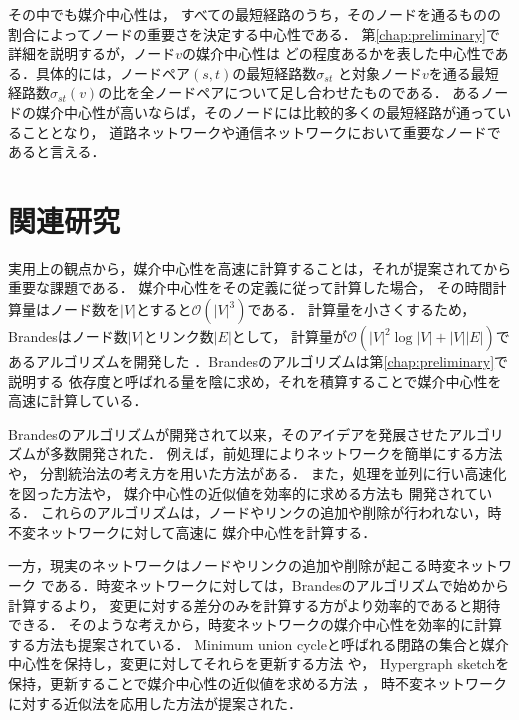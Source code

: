 その中でも媒介中心性\cite{Freeman1977}は，
すべての最短経路のうち，そのノードを通るものの割合によってノードの重要さを決定する中心性である．
第\ref{chap:preliminary}で詳細を説明するが，ノード$v$の媒介中心性は
どの程度あるかを表した中心性である．具体的には，ノードペア$(s,t)$の最短経路数$\sigma_{st}$
と対象ノード$v$を通る最短経路数$\sigma_{st}(v)$の比を全ノードペアについて足し合わせたものである．
あるノードの媒介中心性が高いならば，そのノードには比較的多くの最短経路が通っていることとなり，
道路ネットワークや通信ネットワークにおいて重要なノードであると言える．

\section{関連研究}

実用上の観点から，媒介中心性を高速に計算することは，それが提案されてから重要な課題である．
媒介中心性をその定義に従って計算した場合，
その時間計算量はノード数を$|V|$とすると$\mathcal{O}(|V|^3)$である．
計算量を小さくするため，Brandesはノード数$|V|$とリンク数$|E|$として，
計算量が$\mathcal{O}(|V|^2\log|V|+|V||E|)$であるアルゴリズムを開発した
\cite{Brandes2001}．Brandesのアルゴリズムは第\ref{chap:preliminary}で説明する
依存度と呼ばれる量を陰に求め，それを積算することで媒介中心性を高速に計算している．

Brandesのアルゴリズムが開発されて以来，そのアイデアを発展させたアルゴリズムが多数開発された．
例えば，前処理によりネットワークを簡単にする方法\cite{Puzis2012,Bentert2018}や，
分割統治法の考え方を用いた方法\cite{Erdos2015}がある．
また，処理を並列に行い高速化を図った方法\cite{Bader2006,Tan2009,Edmonds2010,Bernaschi2016}や，
媒介中心性の近似値を効率的に求める方法\cite{Brandes2007,Bader2007,Pfeffer2012,Yoshida2014}も
開発されている．
これらのアルゴリズムは，ノードやリンクの追加や削除が行われない，時不変ネットワークに対して高速に
媒介中心性を計算する．

一方，現実のネットワークはノードやリンクの追加や削除が起こる時変ネットワーク\cite{Holme2012}
である．時変ネットワークに対しては，Brandesのアルゴリズムで始めから計算するより，
変更に対する差分のみを計算する方がより効率的であると期待できる．
そのような考えから，時変ネットワークの媒介中心性を効率的に計算する方法も提案されている．
Minimum union cycleと呼ばれる閉路の集合と媒介中心性を保持し，変更に対してそれらを更新する方法
\cite{Lee2012,Singh2015}や，
Hypergraph sketch\cite{Yoshida2014}を保持，更新することで媒介中心性の近似値を求める方法
\cite{Hayashi2015}，
時不変ネットワークに対する近似法を応用した方法\cite{Bergamini2015a,Bergamini2015b}が提案された．

